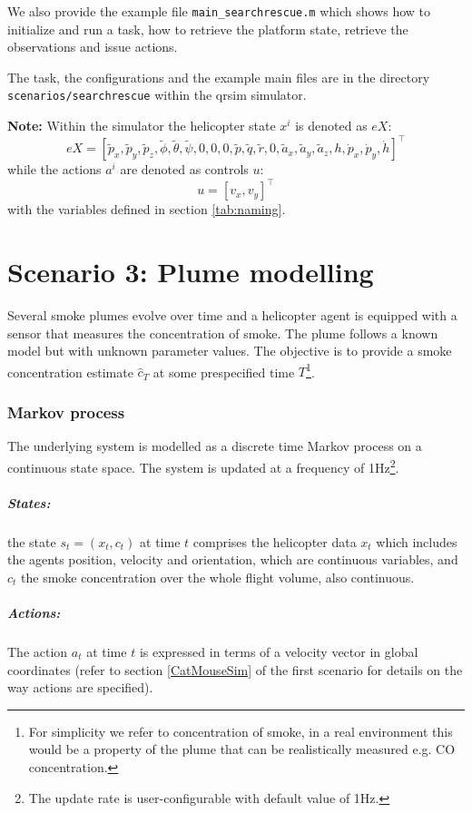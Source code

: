 \documentclass[a4paper,11pt]{report}
\newcommand\mytexttt[1]{\texttt{\hyphenchar\font=45\relax #1}}
\begin{document}
We also provide the example file \texttt{main\_searchrescue.m} which shows how to initialize and run a task, how to retrieve the platform state, retrieve the observations and issue actions.

The task, the configurations and the example main files are in the directory \mytexttt{scenarios/searchrescue} within the qrsim simulator. 

\textbf{Note:}
Within the simulator the helicopter state $x^i$ is denoted as $eX$:
$$eX = [\tilde{p}_x,\tilde{p}_y,\tilde{p}_z,\tilde{\phi},\tilde{\theta},\tilde{\psi},0,0,0,\tilde{p},\tilde{q},\tilde{r},0,\tilde{a}_x,\tilde{a}_y,\tilde{a}_z,h,\dot{p}_x,\dot{p}_y,\dot{h}]^\intercal$$
while the actions $a^i$ are denoted as controls $u$:
$$u=[v_x,v_y]^\intercal$$
with the variables defined in section \ref{tab:naming}.

\newpage
\chapter{Scenario 3: Plume modelling}
Several smoke plumes evolve over time and a helicopter agent is equipped with a sensor that measures the concentration of smoke. The plume follows a known model but with unknown parameter values. The objective is to provide a smoke concentration estimate $\hat{c}_T$ at some prespecified time $T$\footnote{For simplicity we refer to concentration of smoke, in a real environment this would be a property of the plume that can be realistically measured e.g. CO concentration.}.

\subsection{Markov process}
The underlying system is modelled as a discrete time Markov process on a continuous state space. The system is updated at a frequency of 1Hz\footnote{The update rate is user-configurable with default value of 1Hz.}. 

\paragraph{States:} the state $s_t=(x_t,c_t)$ at time $t$ comprises the helicopter data $x_t$ which includes the agents position, velocity and orientation, which are continuous variables, and $c_t$ the smoke concentration over the whole flight volume, also continuous.

\paragraph{Actions:}
The action $a_t$ at time $t$ is expressed in terms of a velocity vector in global coordinates (refer to section \ref{CatMouseSim} of the first scenario for details on the way actions are specified).
\end{document}
